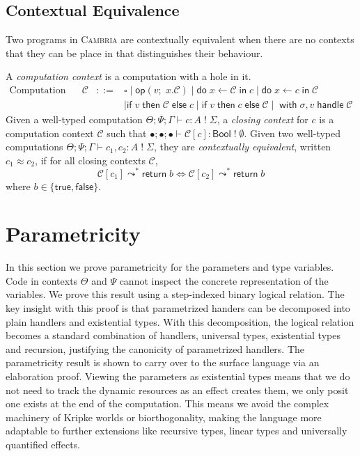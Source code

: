 \documentclass[acmsmall,screen,review,anonymous]{acmart}
\newcommand{\cambria}{\textsc{Cambria}}
\newcommand{\tbool}{\mathsf{Bool}}
\newcommand{\comp}[2]{#1\;!\;#2}
\newcommand{\op}{\mathsf{op}}
\newcommand{\ret}{\mathsf{return}\;}
\newcommand{\ddo}{\mathsf{do}\;}
\newcommand{\iin}{\;\mathsf{in}\;}
\newcommand{\iif}{\mathsf{if}\;}
\newcommand{\then}{\;\mathsf{then}\;}
\newcommand{\eelse}{\;\mathsf{else}\;}
\newcommand{\with}{\mathsf{with}\;}
\newcommand{\handle}{\;\mathsf{handle}\;}
\newcommand{\ttrue}{\mathsf{true}}
\newcommand{\ffalse}{\mathsf{false}}
\newcommand{\Sig}{\Sigma}
\newcommand{\cj}[6]{#1; #2; #3 \vdash #4 : \comp{#5}{#6}}
\newcommand{\eenv}{\bullet}
\newcommand{\ctx}{\mathcal{C}}
\begin{document}
\subsection{Contextual Equivalence}

Two programs in \cambria{} are contextually equivalent when there are no contexts that they can be place in that distinguishes their behaviour.

\begin{definition}
  A \emph{computation context} is a computation with a hole in it.
  \[
  \begin{array}{lrcl}
    \text{Computation contexts} & \ctx & ::= & \square \mid \op(v;\;x.\ctx) \mid \ddo x \leftarrow \ctx \iin c
                                       \mid \ddo x \leftarrow c \iin \ctx
                                       \\[2pt]
                        &      &     & \mid \iif v \then \ctx \eelse c \mid \iif v \then c \eelse \ctx \mid\; \with \sigma, v \handle \ctx
  \end{array}
  \]
  Given a well-typed computation $\cj \Theta \Psi \Gamma c A \Sig$,
  a \emph{closing context} for $c$ is a computation context $\ctx$ such that $\cj \eenv \eenv \eenv {\ctx[c]} \tbool \emptyset$.
  Given two well-typed computations $\cj \Theta \Psi \Gamma {c_1, c_2} A \Sig$, they are \emph{contextually equivalent}, written $c_1 \approx c_2$,
  if for all closing contexts $\ctx$,
  \[
    \ctx[c_1] \leadsto^* \ret b \iff \ctx[c_2] \leadsto^* \ret b
  \]
  where $b \in \{\ttrue, \ffalse\}$.

\end{definition}

\section{Parametricity}\label{sec:parametricity}

In this section we prove parametricity for the parameters and type variables.
Code in contexts $\Theta$ and $\Psi$ cannot inspect the concrete representation of the variables.
We prove this result using a step-indexed binary logical relation.
The key insight with this proof is that parametrized handers can be decomposed into plain handlers and existential types.
With this decomposition, the logical relation becomes a standard combination of handlers, universal types, existential types and recursion,
justifying the canonicity of parametrized handlers.
The parametricity result is shown to carry over to the surface language via an elaboration proof.
Viewing the parameters as existential types means that we do not need to track the dynamic resources as an effect creates them, we only posit one exists at the end of the computation.
This means we avoid the complex machinery of Kripke worlds or biorthogonality, making the language more adaptable to further extensions like
recursive types, linear types and universally quantified effects.
\end{document}

